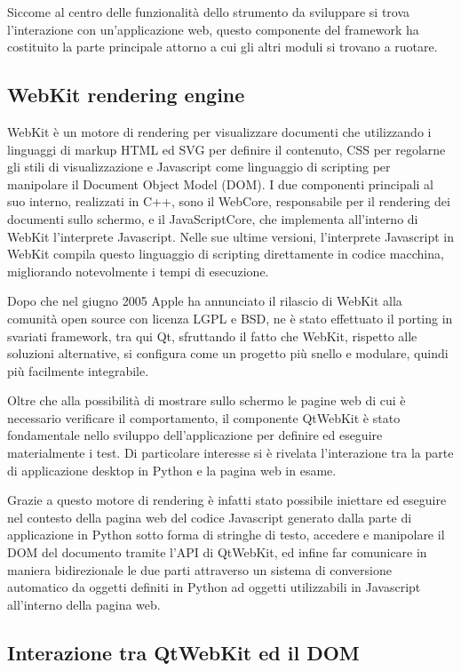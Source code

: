 Siccome al centro delle funzionalità dello strumento da sviluppare si trova l'interazione con un'applicazione web, questo componente del framework ha costituito la parte principale attorno a cui gli altri moduli si trovano a ruotare.

\subsection{WebKit rendering engine}

WebKit è un motore di rendering per visualizzare documenti che utilizzando i linguaggi di markup HTML ed SVG per definire il contenuto, CSS per regolarne gli stili di visualizzazione e Javascript come linguaggio di scripting per manipolare il Document Object Model (DOM). I due componenti principali al suo interno, realizzati in C++, sono il WebCore, responsabile per il rendering dei documenti sullo schermo, e il JavaScriptCore, che implementa all'interno di WebKit l'interprete Javascript. Nelle sue ultime versioni, l'interprete Javascript in WebKit compila questo linguaggio di scripting direttamente in codice macchina, migliorando notevolmente i tempi di esecuzione.

Dopo che nel giugno 2005 Apple ha annunciato il rilascio di WebKit alla comunità open source con licenza LGPL e BSD, ne è stato effettuato il porting in svariati framework, tra qui Qt, sfruttando il fatto che WebKit, rispetto alle soluzioni alternative, si configura come un progetto più snello e modulare, quindi più facilmente integrabile.

Oltre che alla possibilità di mostrare sullo schermo le pagine web di cui è necessario verificare il comportamento, il componente QtWebKit è stato fondamentale nello sviluppo dell'applicazione per definire ed eseguire materialmente i test. Di particolare interesse si è rivelata l'interazione tra la parte di applicazione desktop in Python e la pagina web in esame. 

Grazie a questo motore di rendering è infatti stato possibile iniettare ed eseguire nel contesto della pagina web del codice Javascript generato dalla parte di applicazione in Python sotto forma di stringhe di testo, accedere e manipolare il DOM del documento tramite l'API di QtWebKit, ed infine far comunicare in maniera bidirezionale le due parti attraverso un sistema di conversione automatico da oggetti definiti in Python ad oggetti utilizzabili in Javascript all'interno della pagina web.

\subsection{Interazione tra QtWebKit ed il DOM}

